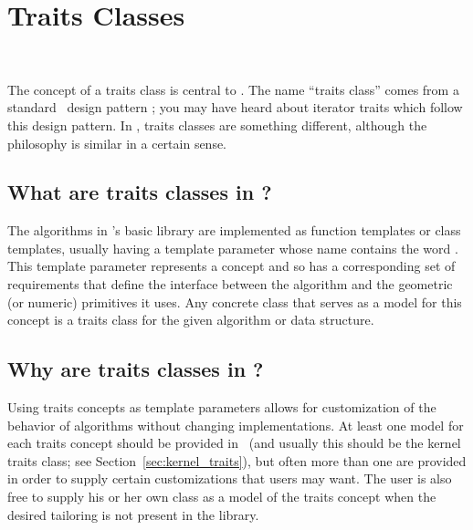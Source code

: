 
\chapter{Traits Classes}
\label{chap:traits_classes}
 \\

The concept of a traits class is central to \cgal. The name ``traits class'' 
comes from a standard \CC\ design pattern \cite{Myers95}; you may have heard
about iterator traits which follow this design pattern. In \cgal, traits
classes are something different, although the philosophy is similar in 
a certain sense. 

\section{What are traits classes in \cgal?} 
\label{sec:what_is_a_traits_class}

The algorithms in \cgal's basic library are implemented as function templates
or class templates, usually having a template parameter whose name contains
the word .  This template parameter 
represents a concept and so has a corresponding set of requirements that
define the interface between the algorithm and the geometric (or numeric) 
primitives it uses.  Any concrete class that serves as a model for this 
concept is a traits class for the given algorithm or data structure.

\section{Why are traits classes in \cgal?}
\label{sec:why_traits_classes}

Using traits concepts as template parameters allows for customization of 
the behavior of algorithms without changing implementations.
At least one model for each traits concept should be provided in
\cgal\ (and usually this should be the kernel traits class; see 
Section~\ref{sec:kernel_traits}), but often more than one are provided
in order to supply certain customizations that users may want.  The user 
is also free to supply his or her own class as a model of the traits
concept when the desired tailoring is not present in the library.

